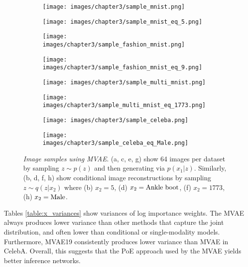 \begin{figure}
\centering
  \begin{subfigure}[b]{.22\linewidth}
    \centering
    \texttt{[image: images/chapter3/sample\_mnist.png]}
    \caption{}
  \end{subfigure}
  \begin{subfigure}[b]{.22\linewidth}
    \centering
    \texttt{[image: images/chapter3/sample\_mnist\_eq\_5.png]}
    \caption{}
  \end{subfigure}
  \begin{subfigure}[b]{.22\linewidth}
    \texttt{[image: images/chapter3/sample\_fashion\_mnist.png]}
    \caption{}
  \end{subfigure}
  \begin{subfigure}[b]{.22\linewidth}
    \texttt{[image: images/chapter3/sample\_fashion\_mnist\_eq\_9.png]}
    \caption{}
  \end{subfigure}

  \begin{subfigure}[b]{.22\linewidth}
    \texttt{[image: images/chapter3/sample\_multi\_mnist.png]}
      \caption{}
  \end{subfigure}
  \begin{subfigure}[b]{.22\linewidth}
    \texttt{[image: images/chapter3/sample\_multi\_mnist\_eq\_1773.png]}
    \caption{}
  \end{subfigure}
  \begin{subfigure}[b]{.22\linewidth}
    \texttt{[image: images/chapter3/sample\_celeba.png]}
    \caption{}
  \end{subfigure}
  \begin{subfigure}[b]{.22\linewidth}
    \texttt{[image: images/chapter3/sample\_celeba\_eq\_Male.png]}
    \caption{}
  \end{subfigure}
  \caption{\textit{Image samples using MVAE}. (a, c, e, g) show 64 images per dataset by sampling $z \sim p(z)$ and then generating via $p(x_1|z)$. Similarly, (b, d, f, h) show conditional image reconstructions by sampling $ z \sim q(z|x_2)$ where (b) $x_2=5$, (d) $x_2=\textup{Ankle boot}$, (f) $x_2=1773$, (h) $x_2=\textup{Male}$.}
  \label{fig:samples}
\end{figure}

Tables \ref{table:x_variances} show variances of log importance weights.
The MVAE always produces lower variance than other methods that capture the joint distribution, and often lower than conditional or single-modality models.
Furthermore, MVAE19 consistently produces lower variance than MVAE in CelebA.
Overall, this suggests that the PoE approach used by the MVAE yields better inference networks.

